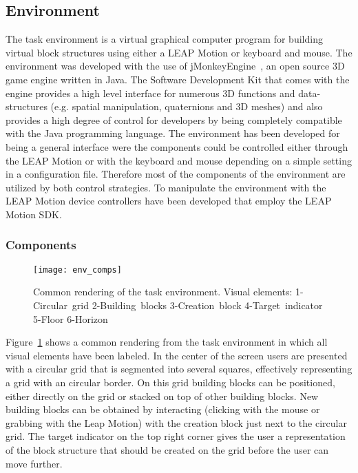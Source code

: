 \subsection{Environment}

The task environment is a virtual graphical computer program for building virtual block structures using either a LEAP Motion or keyboard and mouse. The environment was developed with the use of jMonkeyEngine~\cite{Irene:2012}, an open source 3D game engine written in Java. The Software Development Kit that comes with the engine provides a high level interface for numerous 3D functions and data-structures (e.g. spatial manipulation, quaternions and 3D meshes) and also provides a high degree of control for developers by being completely compatible with the Java programming language. The environment has been developed for being a general interface were the components could be controlled either through the LEAP Motion or with the keyboard and mouse depending on a simple setting in a configuration file. Therefore most of the components of the environment are utilized by both control strategies. To manipulate the environment with the LEAP Motion device controllers have been developed that employ the LEAP Motion SDK.

\subsubsection{Components}

\begin{figure}[H]
\centering
\texttt{[image: env\_comps]}
\caption{\label{fig:environmentcomps} Common rendering of the task environment. Visual elements: 1-Circular~grid 2-Building~blocks 3-Creation~block 4-Target~indicator 5-Floor 6-Horizon}
\end{figure}

\noindent Figure~\ref{fig:environmentcomps} shows a common rendering from the task environment in which all visual elements have been labeled. In the center of the screen users are presented with a circular grid that is segmented into several squares, effectively representing a grid with an circular border. On this grid building blocks can be positioned, either directly on the grid or stacked on top of other building blocks. New building blocks can be obtained by interacting (clicking with the mouse or grabbing with the Leap Motion) with the creation block just next to the circular grid. The target indicator on the top right corner gives the user a representation of the block structure that should be created on the grid before the user can move further.

